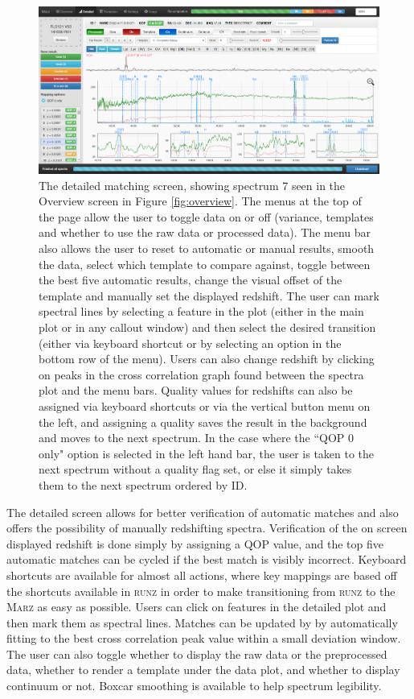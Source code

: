 \documentclass[5p]{elsarticle}
\newcommand{\runz}{\textsc{runz}}
\newcommand{\marz}{\textsc{Marz}}
\begin{document}
\begin{figure}[h]
\centering
\includegraphics[width=\textwidth]{InterfaceZ2.png}
\caption{The detailed matching screen, showing spectrum 7 seen in the Overview screen in Figure \ref{fig:overview}. The menus at the top of the page allow the user to toggle data on or off (variance, templates and whether to use the raw data or processed data). The menu bar also allows the user to reset to automatic or manual results, smooth the data, select which template to compare against, toggle between the best five automatic results, change the visual offset of the template and manually set the displayed redshift. The user can mark spectral lines by selecting a feature in the plot (either in the main plot or in any callout window) and then select the desired transition (either via keyboard shortcut or by selecting an option in the bottom row of the menu). Users can also change redshift by clicking on peaks in the cross correlation graph found between the spectra plot and the menu bars. Quality values for redshifts can also be assigned via keyboard shortcuts or via the vertical button menu on the left, and assigning a quality saves the result in the background and moves to the next spectrum. In the case where the ``QOP 0 only" option is selected in the left hand bar, the user is taken to the next spectrum without a quality flag set, or else it simply takes them to the next spectrum ordered by ID.}
\label{fig:detailed}
\end{figure}

The detailed screen allows for better verification of automatic matches and also offers the possibility of manually redshifting spectra. Verification of the on screen displayed redshift is done simply by assigning a QOP value, and the top five automatic matches can be cycled if the best match is visibly incorrect. Keyboard shortcuts are available for almost all actions, where key mappings are based off the shortcuts available in \runz{} in order to make transitioning from \runz{} to the \marz{} as easy as possible. Users can click on features in the detailed plot and then mark them as spectral lines. Matches can be updated by by automatically fitting to the best cross correlation peak value within a small deviation window. The user can also toggle whether to display the raw data or the preprocessed data, whether to render a template under the data plot, and whether to display continuum or not. Boxcar smoothing is available to help spectrum legibility.
\end{document}
